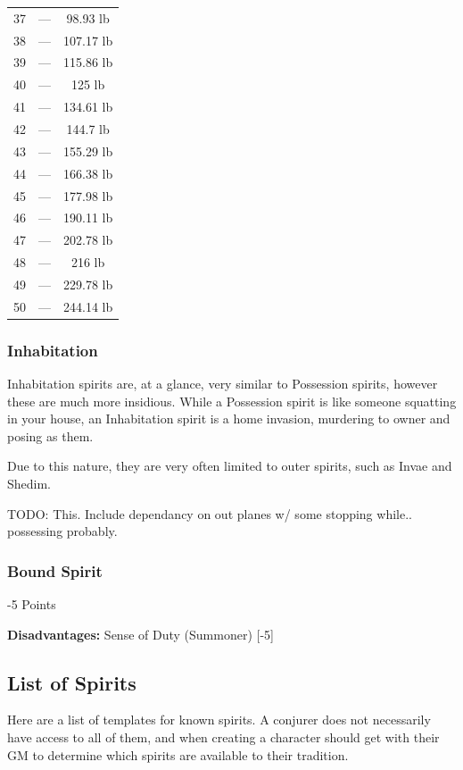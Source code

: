 \begin{multicols*}{3}
\begin{center}
\begin{tabular}{|c|c|c|}
			37 & — & 98.93 lb \\
			38 & — & 107.17 lb \\
			39 & — & 115.86 lb \\
			40 & — & 125 lb \\
			41 & — & 134.61 lb \\
			42 & — & 144.7 lb \\
			43 & — & 155.29 lb \\
			44 & — & 166.38 lb \\
			45 & — & 177.98 lb \\
			46 & — & 190.11 lb \\
			47 & — & 202.78 lb \\
			48 & — & 216 lb \\
			49 & — & 229.78 lb \\
			50 & — & 244.14 lb \\
			\hline
		\end{tabular}
	\end{center}
	
	\subsubsection*{Inhabitation}
	
	Inhabitation spirits are, at a glance, very similar to Possession spirits, however these are much more insidious. While a Possession spirit is like someone squatting in your house, an Inhabitation spirit is a home invasion, murdering to owner and posing as them.
	
	Due to this nature, they are very often limited to outer spirits, such as Invae and Shedim.
	
	TODO: This. Include dependancy on out planes w/ some stopping while.. possessing probably.
	
	\subsubsection*{Bound Spirit}
	\begin{flushright}
		-5 Points
	\end{flushright}
	
	\textbf{Disadvantages:} Sense of Duty (Summoner) [-5]
	
	\subsection{List of Spirits}
	
	Here are a list of templates for known spirits. A conjurer does not necessarily have access to all of them, and when creating a character should get with their GM to determine which spirits are available to their tradition.
	

\end{multicols*}
